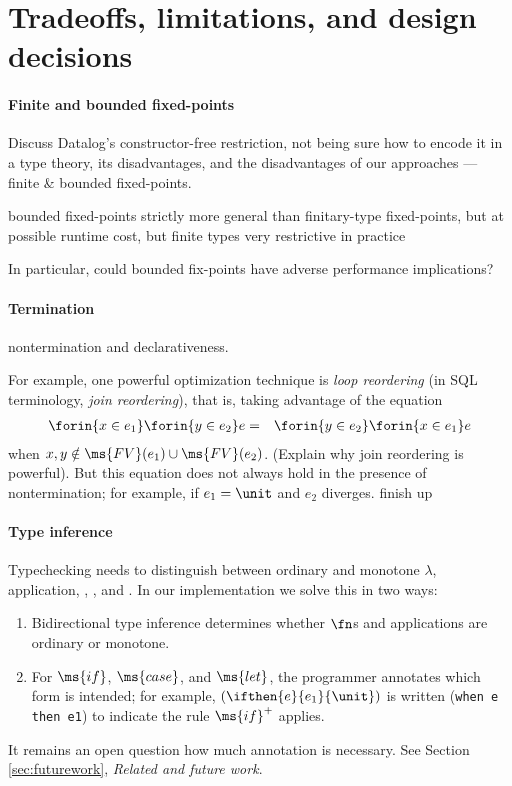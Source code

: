 \section{Tradeoffs, limitations, and design decisions}

\paragraph{Finite and bounded fixed-points} \TODO Discuss
Datalog's constructor-free restriction, not being sure how to encode it in a
type theory, its disadvantages, and the disadvantages of our approaches ---
finite \& bounded fixed-points.

bounded fixed-points strictly more general than finitary-type fixed-points, but
at possible runtime cost, but finite types very restrictive in practice

\TODO In particular, could bounded fix-points have adverse performance
implications?

\paragraph{Termination} \TODO nontermination and declarativeness.

For example, one powerful optimization technique is \emph{loop reordering} (in
SQL terminology, \emph{join reordering}), that is, taking advantage of the
equation
\begin{eqnarray*}
  \forin{x \in e_1} \forin{y \in e_2} e
  &=& \forin{y \in e_2} \forin{x \in e_1} e
\end{eqnarray*}
when $x,y \notin \ms{FV}(e_1) \cup \ms{FV}(e_2)$. (\TODO Explain why join
reordering is powerful). But this equation does not always hold in the presence
of nontermination; for example, if $e_1 = \unit$ and $e_2$ diverges. \TODO
finish up

\paragraph{Type inference} Typechecking needs to distinguish between ordinary
and monotone $\lambda$, application, , , and . In our
implementation we solve this in two ways:
\begin{enumerate}
\item Bidirectional type inference  determines whether $\fn$s and
  applications are ordinary or monotone.
\item For $\ms{if}$, $\ms{case}$, and $\ms{let}$, the programmer annotates which
  form is intended; for example, $(\ifthen{e}{e_1}{\unit})$ is written
  (\texttt{when e then e1}) to indicate the rule $\ms{if}^+$ applies.
\end{enumerate}

It remains an open question how much annotation is necessary. See
Section \ref{sec:futurework}, \emph{Related and future work}.

